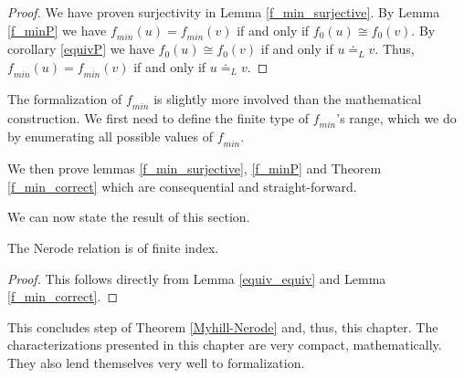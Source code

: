 \begin{proof}
    We have proven surjectivity in Lemma \ref{f_min_surjective}. 
    By Lemma \ref{f_minP} we have $\mathit{f_{min}}(u) = \mathit{f_{min}}(v)$ if and only if ${f_0}(u) \cong {f_0}(v)$.
    By corollary \ref{equivP} we have ${f_0}(u) \cong {f_0}(v)$ if and only if $u \doteq_L v$.
    Thus, $\mathit{f_{min}}(u) = \mathit{f_{min}}(v)$ if and only if $u \doteq_L v$.
\end{proof}


The formalization of $\mathit{f_{min}}$ is slightly more involved than the mathematical construction. 
We first need to define the finite type of $\mathit{f_{min}}$'s range, 
which we do by enumerating all possible values of $\mathit{f_{min}}$.



We then prove lemmas \ref{f_min_surjective}, \ref{f_minP} and Theorem \ref{f_min_correct} which are consequential and straight-forward.



We can now state the result of this section. 

\begin{corollary}
    The Nerode relation is of finite index.
\end{corollary}
\begin{proof}
    This follows directly from Lemma \ref{equiv_equiv} and Lemma \ref{f_min_correct}.
\end{proof}



This concludes step  of Theorem \ref{Myhill-Nerode} and, thus, this chapter. 
The characterizations presented in this chapter are very compact, mathematically.
They also lend themselves very well to formalization.


